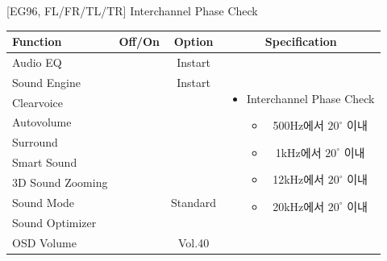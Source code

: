 \documentclass{beamer}
\begin{document}
\begin{frame}[t]{[EG96, FL/FR/TL/TR] Interchannel Phase Check}
\begin{tiny}
\begin{tabular}{@{}lccc@{}}
\toprule
Function & Off/On & Option & Specification \\
\midrule
Audio EQ & \color{black}{Off} & Instart &
\multirow{10}{60mm}{
\begin{itemize}
\item Interchannel Phase Check
	\begin{itemize}
	\item 500Hz에서 \(20^\circ\) 이내
	\item 1kHz에서 \(20^\circ\) 이내
	\item 12kHz에서 \(20^\circ\) 이내
	\item 20kHz에서 \(20^\circ\) 이내
	\end{itemize}
\end{itemize}
} \\
Sound Engine & \color{black}{Off} & Instart & \\
Clearvoice & \color{black}{Off} & & \\
Autovolume & \color{black}{Off} & & \\
Surround & \color{black}{Off} & & \\
Smart Sound & \color{black}{Off} & & \\
3D Sound Zooming & \color{black}{Off} & & \\
Sound Mode & \color{blue}{On} & Standard & \\
Sound Optimizer & \color{black}{Off} & & \\
OSD Volume & \color{blue}{On} & Vol.40 & \\
\midrule
\end{tabular}
\end{tiny}

\end{frame}
\end{document}
